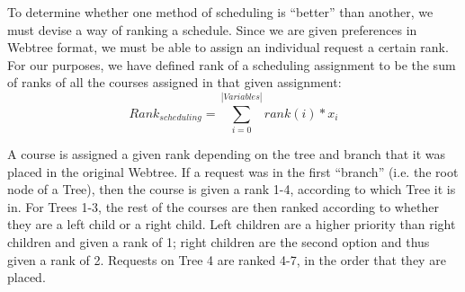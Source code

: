 To determine whether one method of scheduling is ``better'' than
another, we must devise a way of ranking a schedule. Since we are
given preferences in Webtree format, we must be able to assign an
individual request a certain rank. For our purposes, we have defined
rank of a scheduling assignment to be the sum of ranks of all the
courses assigned in that given assignment: \begin{equation}\label{rank}Rank_{scheduling} =
  \sum_{i=0}^{|Variables|}{rank(i)*x_i}\end{equation} 

A course is assigned a given rank depending on the tree and branch
that it was placed in the original Webtree. If a request was in the
first ``branch'' (i.e. the root node of a Tree), then the course is given
a rank {1-4}, according to which Tree it is in. For Trees {1-3}, the
rest of the courses are then ranked according to whether they are a
left child or a right child. Left children are a higher priority than right
children and given a rank of 1; right children are the second option
and thus given a rank of 2. Requests on Tree 4 are ranked {4-7}, in
the order that they are placed.



